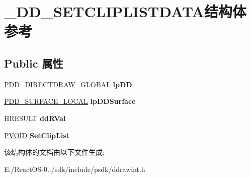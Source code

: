 \hypertarget{struct___d_d___s_e_t_c_l_i_p_l_i_s_t_d_a_t_a}{}\section{\+\_\+\+D\+D\+\_\+\+S\+E\+T\+C\+L\+I\+P\+L\+I\+S\+T\+D\+A\+T\+A结构体 参考}
\label{struct___d_d___s_e_t_c_l_i_p_l_i_s_t_d_a_t_a}
\subsection*{Public 属性}
\begin{DoxyCompactItemize}
\item 
\mbox{\label{struct___d_d___s_e_t_c_l_i_p_l_i_s_t_d_a_t_a_a33302fd5c2bfdb992455293154f30d15}} 
\hyperlink{struct___d_d___d_i_r_e_c_t_d_r_a_w___g_l_o_b_a_l}{P\+D\+D\+\_\+\+D\+I\+R\+E\+C\+T\+D\+R\+A\+W\+\_\+\+G\+L\+O\+B\+AL} {\bfseries lp\+DD}
\item 
\mbox{\label{struct___d_d___s_e_t_c_l_i_p_l_i_s_t_d_a_t_a_a4b570f1710979d49b32001b14f73d6bd}} 
\hyperlink{struct___d_d___s_u_r_f_a_c_e___l_o_c_a_l}{P\+D\+D\+\_\+\+S\+U\+R\+F\+A\+C\+E\+\_\+\+L\+O\+C\+AL} {\bfseries lp\+D\+D\+Surface}
\item 
\mbox{\label{struct___d_d___s_e_t_c_l_i_p_l_i_s_t_d_a_t_a_aec6a91ea2a1b68f94339f423ab79c8d4}} 
H\+R\+E\+S\+U\+LT {\bfseries dd\+R\+Val}
\item 
\mbox{\label{struct___d_d___s_e_t_c_l_i_p_l_i_s_t_d_a_t_a_a410513bfbb85bc88d572f8f29397b586}} 
\hyperlink{interfacevoid}{P\+V\+O\+ID} {\bfseries Set\+Clip\+List}
\end{DoxyCompactItemize}


该结构体的文档由以下文件生成\+:\begin{DoxyCompactItemize}
\item 
E\+:/\+React\+O\+S-\/0../sdk/include/psdk/ddrawint.\+h\end{DoxyCompactItemize}
